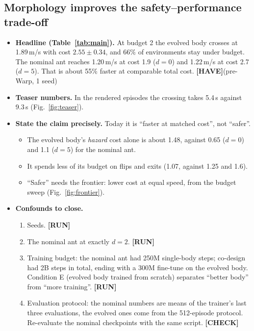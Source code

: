 \documentclass[sigconf,review]{acmart}
\newcommand{\statustag}[2]{\textcolor{#1}{\textsf{\scriptsize\bfseries[#2]}}}
\newcommand{\HAVE}{\statustag{teal!70!black}{HAVE}\hspace{0.3em}}
\newcommand{\RUN}{\statustag{red!75!black}{RUN}\hspace{0.3em}}
\newcommand{\CHECK}{\statustag{orange!85!black}{CHECK}\hspace{0.3em}}
\begin{document}
\subsection{Morphology improves the safety--performance trade-off}
\label{sec:res-main}
\begin{itemize}
\item \textbf{Headline (Table~\ref{tab:main}).} At budget 2 the evolved body crosses at 1.89\,m/s with cost $2.55 \pm 0.34$, and 66\% of environments stay under budget. The nominal ant reaches 1.20\,m/s at cost 1.9 ($d=0$) and 1.22\,m/s at cost 2.7 ($d=5$). That is about 55\% faster at comparable total cost. \HAVE (pre-Warp, 1 seed)
\item \textbf{Teaser numbers.} In the rendered episodes the crossing takes 5.4\,s against 9.3\,s (Fig.~\ref{fig:teaser}).
\item \textbf{State the claim precisely.} Today it is ``faster at matched cost'', not ``safer''.
  \begin{itemize}
  \item The evolved body's \emph{hazard} cost alone is about 1.48, against 0.65 ($d=0$) and 1.1 ($d=5$) for the nominal ant.
  \item It spends less of its budget on flips and exits (1.07, against 1.25 and 1.6).
  \item ``Safer'' needs the frontier: lower cost at equal speed, from the budget sweep (Fig.~\ref{fig:frontier}).
  \end{itemize}
\item \textbf{Confounds to close.}
  \begin{enumerate}
  \item Seeds. \RUN
  \item The nominal ant at exactly $d = 2$. \RUN
  \item Training budget: the nominal ant had 250M single-body steps; co-design had 2B steps in total, ending with a 300M fine-tune on the evolved body. Condition E (evolved body trained from scratch) separates ``better body'' from ``more training''. \RUN
  \item Evaluation protocol: the nominal numbers are means of the trainer's last three evaluations, the evolved ones come from the 512-episode protocol. Re-evaluate the nominal checkpoints with the same script. \CHECK
  \end{enumerate}
\end{itemize}
\end{document}
